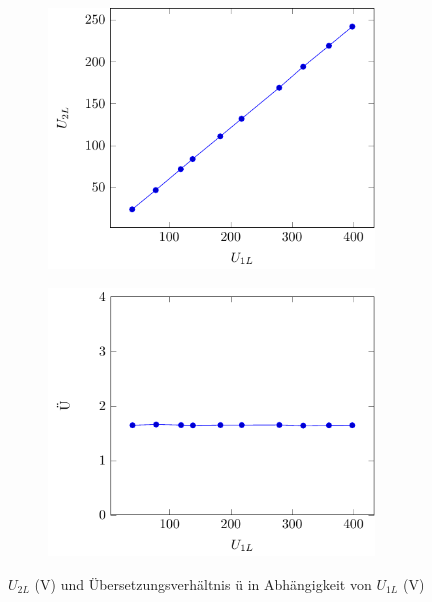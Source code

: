   \begin{figure}[H]
	\begin{subfigure}{0.48\textwidth}
	  \centering\includegraphics[width=0.95\textwidth]{fig/ll_u1ue.pdf}
	\end{subfigure}
	\begin{subfigure}{0.48\textwidth}
	  \centering\includegraphics[width=0.95\textwidth]{fig/ll_ue.pdf}
	\end{subfigure}
	\caption{$U_{2L}$ (\si{\volt})  und Übersetzungsverhältnis ü in Abhängigkeit von $U_{1L}$ (\si{\volt})  }
  \end{figure}
  
